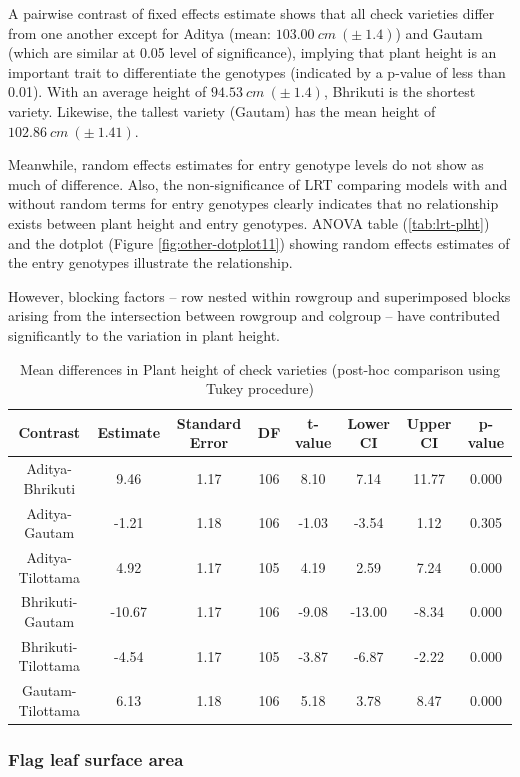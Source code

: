 \documentclass[12pt,oneside]{dukestatscithesis} %
\theoremstyle{definition}
\theoremstyle{definition}
\theoremstyle{definition}
\theoremstyle{remark}
\begin{document}
A pairwise contrast of fixed effects estimate shows that all check
varieties differ from one another except for Aditya (mean:
\(103.00\ cm\ (\pm\ 1.4)\)) and Gautam (which are similar at 0.05 level
of significance), implying that plant height is an important trait to
differentiate the genotypes (indicated by a p-value of less than 0.01).
With an average height of \(94.53\ cm\ (\pm\ 1.4)\), Bhrikuti is the
shortest variety. Likewise, the tallest variety (Gautam) has the mean
height of \(102.86\ cm\ (\pm\ 1.41)\).

Meanwhile, random effects estimates for entry genotype levels do not
show as much of difference. Also, the non-significance of LRT comparing
models with and without random terms for entry genotypes clearly
indicates that no relationship exists between plant height and entry
genotypes. ANOVA table (\ref{tab:lrt-plht}) and the dotplot (Figure
\ref{fig:other-dotplot11}) showing random effects estimates of the entry
genotypes illustrate the relationship.

However, blocking factors -- row nested within rowgroup and superimposed
blocks arising from the intersection between rowgroup and colgroup --
have contributed significantly to the variation in plant height.
\begin{table}[H]

\caption{\label{tab:other-meanconf-tab1}Mean differences in Plant height of check varieties (post-hoc comparison using Tukey procedure)}
\centering
\begin{tabular}[t]{cccccccc}
\toprule
Contrast & Estimate & Standard Error & DF & t-value & Lower CI & Upper CI & p-value\\
\midrule
Aditya-Bhrikuti & 9.46 & 1.17 & 106 & 8.10 & 7.14 & 11.77 & 0.000\\
Aditya-Gautam & -1.21 & 1.18 & 106 & -1.03 & -3.54 & 1.12 & 0.305\\
Aditya-Tilottama & 4.92 & 1.17 & 105 & 4.19 & 2.59 & 7.24 & 0.000\\
Bhrikuti-Gautam & -10.67 & 1.17 & 106 & -9.08 & -13.00 & -8.34 & 0.000\\
Bhrikuti-Tilottama & -4.54 & 1.17 & 105 & -3.87 & -6.87 & -2.22 & 0.000\\
Gautam-Tilottama & 6.13 & 1.18 & 106 & 5.18 & 3.78 & 8.47 & 0.000\\
\bottomrule
\end{tabular}
\end{table}
\subsubsection{Flag leaf surface area}\label{flag-leaf-surface-area}
\end{document}
